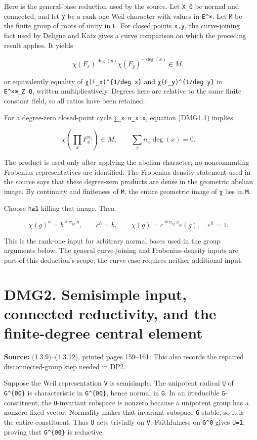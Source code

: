 \documentclass[
]{report}
\begin{document}
Here is the general-base reduction used by the source. Let \texttt{X\_0}
be normal and connected, and let \texttt{χ} be a rank-one Weil character
with values in \texttt{E\^{}×}. Let \texttt{M} be the finite group of
roots of unity in \texttt{E}. For closed points \texttt{x,y}, the
curve-joining fact used by Deligne and Katz gives a curve comparison on
which the preceding result applies. It yields

\[
\chi(F_x)^{\deg(y)}\chi(F_y)^{-\deg(x)}\in M,
\tag{DMG1.1}
\]

or equivalently equality of \texttt{χ(F\_x)\^{}\{1/deg\ x\}} and
\texttt{χ(F\_y)\^{}\{1/deg\ y\}} in \texttt{E\^{}×⊗\_Z\ Q}, written
multiplicatively. Degrees here are relative to the same finite constant
field, so all ratios have been retained.

For a degree-zero closed-point cycle \texttt{∑\_x\ n\_x\ x}, equation
(DMG1.1) implies

\[
\chi\left(\prod_xF_x^{n_x}\right)\in M,
\qquad \sum_x n_x\deg(x)=0.
\tag{DMG1.2}
\]

The product is used only after applying the abelian character; no
noncommuting Frobenius representatives are identified. The
Frobenius-density statement used in the source says that these
degree-zero products are dense in the geometric abelian image. By
continuity and finiteness of \texttt{M}, the entire geometric image of
\texttt{χ} lies in \texttt{M}.

Choose \texttt{h≥1} killing that image. Then

\[
\chi(g)^h=b^{\deg_Q g},\qquad c^h=b,\qquad
\chi(g)=c^{\deg_Qg}\varepsilon(g),\quad\varepsilon^h=1.
\tag{DMG1.3}
\]

This is the rank-one input for arbitrary normal bases used in the group
arguments below. The general curve-joining and Frobenius-density inputs
are part of this deduction's scope; the curve case requires neither
additional input.

\section{DMG2. Semisimple input, connected reductivity, and the
finite-degree central
element}\label{dmg2.-semisimple-input-connected-reductivity-and-the-finite-degree-central-element}

\textbf{Source:} (1.3.9)--(1.3.12), printed pages 159--161. This also
records the repaired disconnected-group step needed in DP2.

Suppose the Weil representation \texttt{V} is semisimple. The unipotent
radical \texttt{U} of \texttt{G\^{}\{00\}} is characteristic in
\texttt{G\^{}\{00\}}, hence normal in \texttt{G}. In an irreducible
\texttt{G}-constituent, the \texttt{U}-invariant subspace is nonzero
because a unipotent group has a nonzero fixed vector. Normality makes
that invariant subspace \texttt{G}-stable, so it is the entire
constituent. Thus \texttt{U} acts trivially on \texttt{V}. Faithfulness
on \texttt{G\^{}0} gives \texttt{U=1}, proving that \texttt{G\^{}\{00\}}
is reductive.
\end{document}
